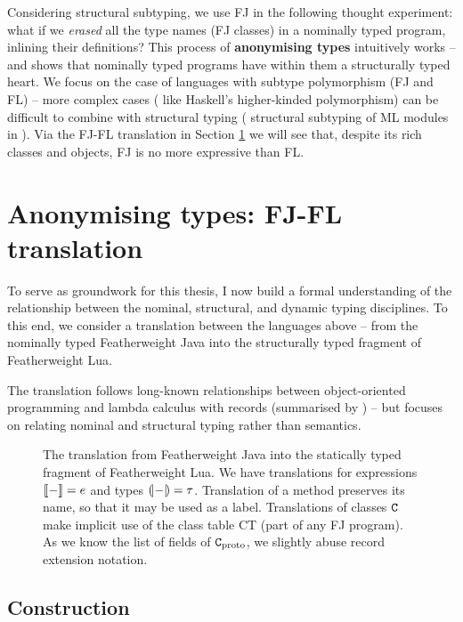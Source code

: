 Considering structural subtyping, we use FJ in the following thought experiment: what if we \emph{erased} all the type names (FJ classes) in a nominally typed program, inlining their definitions? This process of \textbf{anonymising types} intuitively works -- and shows that nominally typed programs have within them a structurally typed heart. We focus on the case of languages with subtype polymorphism (FJ and FL) -- more complex cases (\eg{} like Haskell's higher-kinded polymorphism) can be difficult to combine with structural typing (\cf{} structural subtyping of ML modules in \textcite{modular-implicits}).
Via the FJ-FL translation in Section \ref{sec:translations} we will see that, despite its rich classes and objects, FJ is no more expressive than FL.

\section{Anonymising types: FJ-FL translation}
\label{sec:translations}

To serve as groundwork for this thesis, I now build a formal understanding of the relationship between the nominal, structural, and dynamic typing disciplines. To this end, we consider a translation between the languages above -- from the nominally typed Featherweight Java into the structurally typed fragment of Featherweight Lua. 

The translation follows long-known relationships between object-oriented programming and lambda calculus with records (summarised by \eg{} \textcite{pierce-thesis}) -- but focuses on relating nominal and structural typing rather than semantics.


\begin{figure}
    \centering
    
    \caption{The translation from Featherweight Java into the statically typed fragment of Featherweight Lua. We have translations for expressions $\denot{-} = e$ and types $\denoty{-} = \tau$. Translation of a method preserves its name, so that it may be used as a label. Translations of classes $\texttt{C}$ make implicit use of the class table $\mathrm{CT}$ (part of any FJ program). As we know the list of fields of $\texttt{C}_\mathrm{proto}$, we slightly abuse record extension notation.}
    \label{fig:translation}
\end{figure}

\subsection{Construction}

